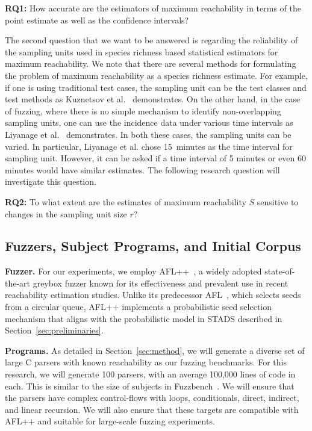 \documentclass[conference,anonymous,review]{IEEEtran}
\begin{document}
\noindent\textbf{RQ1:} How accurate are the estimators of maximum reachability
in terms of the point estimate as well as the confidence intervals?

The second question that we want to be answered is regarding the reliability
of the sampling units used in species richness based statistical estimators for
maximum reachability. We note that there are several methods for formulating
the problem of maximum reachability as a species richness estimate. For example,
if one is using traditional test cases, the sampling unit can be the test
classes and test methods as Kuznetsov et al.~\cite{Kuznetsov2024empirical}
demonstrates. On the other hand, in the case of fuzzing, where there is no
simple mechanism to identify non-overlapping sampling units, one can use the
incidence data under various time intervals as
Liyanage et al.~\cite{liyanage2023reachable} demonstrates. In both these cases, the
sampling units can be varied. In particular, Liyanage et al. chose 15~minutes
as the time interval for sampling unit. However, it can be asked if a time
interval of 5 minutes or even 60 minutes would have similar estimates.
The following research question will investigate this question.

\noindent\textbf{RQ2:} To what extent are the estimates of maximum reachability
$S$ sensitive to changes in the sampling unit size $r$?

\subsection{Fuzzers, Subject Programs, and Initial Corpus}

\noindent\textbf{Fuzzer.} For our experiments,
we employ AFL++~\cite{fioraldi2020AFL++}, a widely adopted
state-of-the-art greybox fuzzer known for its effectiveness and prevalent use in
recent reachability estimation studies.
Unlike its predecessor AFL~\cite{zalewski2017american}, which selects seeds from a circular queue, AFL++ implements a probabilistic seed selection mechanism that aligns with the probabilistic model in STADS described in Section~\ref{sec:preliminaries}.

\noindent\textbf{Programs.} As detailed in Section~\ref{sec:method}, we will generate a
diverse set of large C parsers with known reachability as our
fuzzing benchmarks. For this research, we will generate 100
parsers, with an average 100,000 lines of code in each.
This is similar to the size of subjects in
Fuzzbench~\cite{metzman2021fuzzbench}.
We will ensure that the parsers have complex control-flows with
loops, conditionals, direct, indirect, and linear recursion.
We will also ensure that these targets are compatible with AFL++ and suitable for
large-scale fuzzing experiments.
\end{document}
